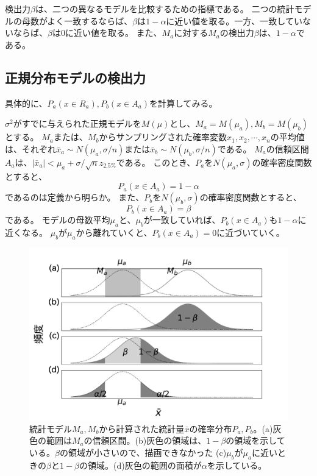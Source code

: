 検出力$\beta$は、二つの異なるモデルを比較するための指標である。
二つの統計モデルの母数がよく一致するならば、$\beta$は$1-\alpha$に近い値を取る。一方、一致していないならば、$\beta$は0に近い値を取る。
また、$M_a$に対する$M_a$の検出力$\beta$は、$1-\alpha$である。

\subsection{正規分布モデルの検出力}
具体的に、$P_a(x \in R_a),P_b(x \in A_a)$を計算してみる。

$\sigma^2$がすでに与えられた正規モデルを$M(\mu)$とし、$M_a=M(\mu_a),M_b=M(\mu_b)$とする。
$M_a$または、$M_b$からサンプリングされた確率変数$x_1,x_2,\cdots,x_n$の平均値は、それぞれ$\bar{x}_a\sim N(\mu_a,\sigma/n)$または$\bar{x}_b\sim N(\mu_b,\sigma/n)$である。
$M_a$の信頼区間$A_a$は、$|\bar{x}_a|<\mu_a+\sigma / \sqrt{n}z_{2.5\%}$である。
このとき、$P_a$を$N(\mu_a,\sigma)$の確率密度関数とすると、
\begin{equation*}
    P_a(x \in A_a) = 1-\alpha
\end{equation*}
であるのは定義から明らか。
また、$P_b$を$N(\mu_b,\sigma)$の確率密度関数とすると、
\begin{equation*}
    P_b(x \in A_a ) = \beta
\end{equation*}
である。
モデルの母数平均$\mu_a$と、$\mu_b$が一致していれば、$P_b(x \in A_a )$も$1-\alpha$に近くなる。
$\mu_b$が$\mu_a$から離れていくと、$P_b(x \in A_a)=0$に近づいていく。


\begin{figure}
\begin{center}
    \includegraphics[width=15cm]{./image/04_/power_of_a_test_2.pdf}
    \caption{統計モデル$M_a,M_b$から計算された統計量$\bar{x}$の確率分布$P_a,P_b$。(a)灰色の範囲は$M_a$の信頼区間。(b)灰色の領域は、$1-\beta$の領域を示している。$\beta$の領域が小さいので、描画できなかった (c)$\mu_b$が$\mu_a$に近いときの$\beta$と$1-\beta$の領域。(d)灰色の範囲の面積が$\alpha$を示している。}
    \label{fig:power_of_test_alpha_beta}
\end{center}
\end{figure}


